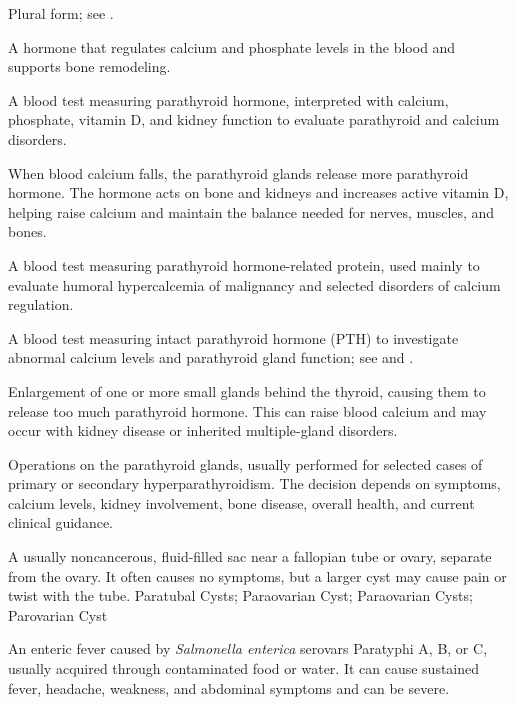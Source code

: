  Plural form; see .

 A hormone that regulates calcium and phosphate levels in the blood and supports bone remodeling.

 A blood test measuring parathyroid hormone, interpreted with calcium, phosphate, vitamin D, and kidney function to evaluate parathyroid and calcium disorders.

 When blood calcium falls, the parathyroid glands release more parathyroid hormone. The hormone acts on bone and kidneys and increases active vitamin D, helping raise calcium and maintain the balance needed for nerves, muscles, and bones.

 A blood test measuring parathyroid hormone-related protein, used mainly to evaluate humoral hypercalcemia of malignancy and selected disorders of calcium regulation.

 A blood test measuring intact parathyroid hormone (PTH) to investigate abnormal calcium levels and parathyroid gland function; see  and .

 Enlargement of one or more small glands behind the thyroid, causing them to release too much parathyroid hormone. This can raise blood calcium and may occur with kidney disease or inherited multiple-gland disorders.

 Operations on the parathyroid glands, usually performed for selected cases of primary or
secondary hyperparathyroidism. The decision depends on symptoms, calcium levels, kidney involvement, bone disease,
overall health, and current clinical guidance.

 A usually noncancerous, fluid-filled sac near a fallopian tube or ovary, separate from the ovary. It often causes no symptoms, but a larger cyst may cause pain or twist with the tube.
\synonyms
Paratubal Cysts; Paraovarian Cyst; Paraovarian Cysts; Parovarian Cyst

 An enteric fever caused by \textit{Salmonella enterica} serovars Paratyphi A, B, or C, usually acquired through contaminated food or water. It can cause sustained fever, headache, weakness, and abdominal symptoms and can be severe.

